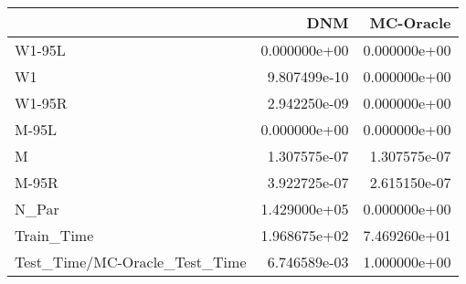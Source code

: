 \begin{tabular}{lrr}
\toprule
{} &           DNM &     MC-Oracle \\
\midrule
W1-95L                        &  0.000000e+00 &  0.000000e+00 \\
W1                            &  9.807499e-10 &  0.000000e+00 \\
W1-95R                        &  2.942250e-09 &  0.000000e+00 \\
M-95L                         &  0.000000e+00 &  0.000000e+00 \\
M                             &  1.307575e-07 &  1.307575e-07 \\
M-95R                         &  3.922725e-07 &  2.615150e-07 \\
N\_Par                         &  1.429000e+05 &  0.000000e+00 \\
Train\_Time                    &  1.968675e+02 &  7.469260e+01 \\
Test\_Time/MC-Oracle\_Test\_Time &  6.746589e-03 &  1.000000e+00 \\
\bottomrule
\end{tabular}
